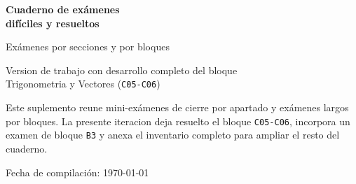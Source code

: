 \begin{titlepage}
\thispagestyle{fancy}
\centering
\vspace*{2.6cm}

{\Huge\bfseries Cuaderno de ex\'amenes\\[0.35em] dif\'iciles y resueltos\par}
\vspace{1.1cm}

{\Large Ex\'amenes por secciones y por bloques\par}
\vspace{1.3cm}

{\large Version de trabajo con desarrollo completo del bloque\\[0.25em]
Trigonometria y Vectores (\texttt{C05-C06})\par}
\vspace{1.3cm}

\begin{tcolorbox}[basebox,width=0.86\textwidth]
Este suplemento reune mini-ex\'amenes de cierre por apartado y ex\'amenes largos por bloques.
La presente iteracion deja resuelto el bloque \texttt{C05-C06}, incorpora un examen de bloque
\texttt{B3} y anexa el inventario completo para ampliar el resto del cuaderno.
\end{tcolorbox}

\vfill
{\large Fecha de compilaci\'on: \today\par}
\end{titlepage}

